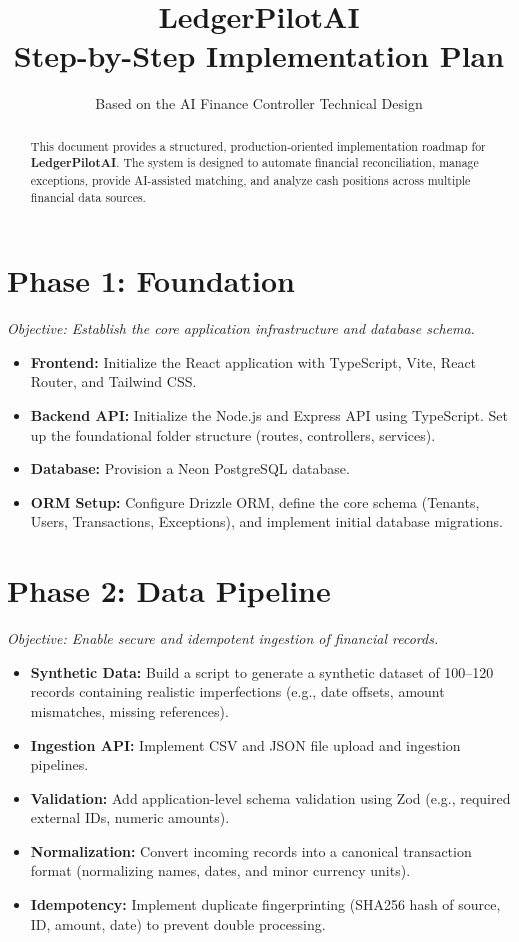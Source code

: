 \documentclass[11pt,a4paper]{article}
\title{\textbf{\Huge LedgerPilotAI} \\ \vspace{0.5em} \Large Step-by-Step Implementation Plan}
\author{Based on the AI Finance Controller Technical Design}
\date{}
\begin{document}
\maketitle
\thispagestyle{empty}

\begin{abstract}
\noindent This document provides a structured, production-oriented implementation roadmap for \textbf{LedgerPilotAI}. The system is designed to automate financial reconciliation, manage exceptions, provide AI-assisted matching, and analyze cash positions across multiple financial data sources.
\end{abstract}

\vspace{1em}

\section{Phase 1: Foundation}
\textit{Objective: Establish the core application infrastructure and database schema.}
\begin{itemize}[label=$\bullet$, leftmargin=*]
    \item \textbf{Frontend:} Initialize the React application with TypeScript, Vite, React Router, and Tailwind CSS.
    \item \textbf{Backend API:} Initialize the Node.js and Express API using TypeScript. Set up the foundational folder structure (routes, controllers, services).
    \item \textbf{Database:} Provision a Neon PostgreSQL database.
    \item \textbf{ORM Setup:} Configure Drizzle ORM, define the core schema (Tenants, Users, Transactions, Exceptions), and implement initial database migrations.
\end{itemize}

\section{Phase 2: Data Pipeline}
\textit{Objective: Enable secure and idempotent ingestion of financial records.}
\begin{itemize}[label=$\bullet$, leftmargin=*]
    \item \textbf{Synthetic Data:} Build a script to generate a synthetic dataset of 100--120 records containing realistic imperfections (e.g., date offsets, amount mismatches, missing references).
    \item \textbf{Ingestion API:} Implement CSV and JSON file upload and ingestion pipelines.
    \item \textbf{Validation:} Add application-level schema validation using Zod (e.g., required external IDs, numeric amounts).
    \item \textbf{Normalization:} Convert incoming records into a canonical transaction format (normalizing names, dates, and minor currency units).
    \item \textbf{Idempotency:} Implement duplicate fingerprinting (SHA256 hash of source, ID, amount, date) to prevent double processing.
\end{itemize}
\end{document}
